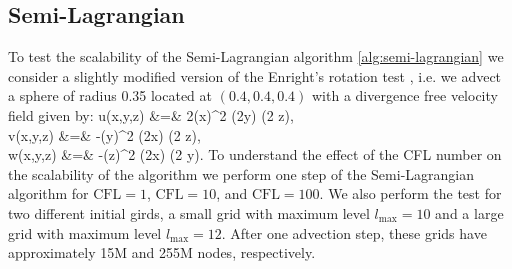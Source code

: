 \subsection{Semi-Lagrangian}
To test the scalability of the Semi-Lagrangian algorithm \ref{alg:semi-lagrangian} we consider a slightly modified version of the Enright's rotation test \cite{Enright;Fedkiw;Ferziger;etal:02:A-Hybrid-Particle-Le}, i.e. we advect a sphere of radius 0.35 located at $(0.4, 0.4, 0.4)$ with a divergence free velocity field given by:
\bean
u(x,y,z) &=& 2\sin(\pi x)^2 \sin(2\pi y) \sin(2 \pi z), \\
v(x,y,z) &=& -\sin(\pi y)^2 \sin(2\pi x) \sin(2 \pi z),\\
w(x,y,z) &=& -\sin(\pi z)^2 \sin(2\pi x) \sin(2 \pi y). 
\eean
To understand the effect of the CFL number on the scalability of the algorithm we perform one step of the Semi-Lagrangian algorithm for $\text{CFL} = 1$, $\text{CFL} = 10$, and $\text{CFL} = 100$. We also perform the test for two different initial girds, a small grid with maximum level $l_\text{max} = 10$ and a large grid with maximum level $l_\text{max} = 12$. After one advection step, these grids have approximately 15M and 255M nodes, respectively. 
